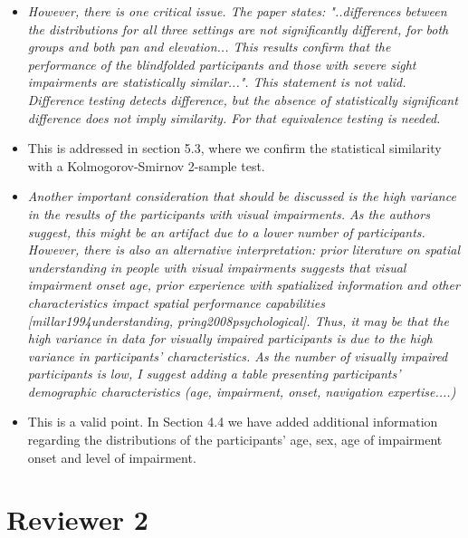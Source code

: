 \documentclass{article}
\begin{document}
\begin{itemize}
  \item \textit{However, there is one critical issue. The paper states: "..differences between the distributions for all three settings are not significantly different, for both groups and both pan and elevation... This results confirm that the performance of the blindfolded participants and those with severe sight impairments are statistically similar...".
    This statement is not valid. Difference testing detects difference, but the absence of statistically significant difference does not imply similarity. For that equivalence testing is needed.}
  \item[] This is addressed in section 5.3, where we confirm the statistical similarity with a Kolmogorov-Smirnov 2-sample test. 

  \item \textit{Another important consideration that should be discussed is the high variance in the results of the participants with visual impairments. As the authors suggest, this might be an artifact due to a lower number of participants. However, there is also an alternative interpretation: prior literature on spatial understanding in people with visual impairments suggests that visual impairment onset age, prior experience with spatialized information and other characteristics impact spatial performance capabilities [millar1994understanding, pring2008psychological]. Thus, it may be that the high variance in data for visually impaired participants is due to the high variance in participants' characteristics. As the number of visually impaired participants is low, I suggest adding a table presenting participants' demographic characteristics (age, impairment, onset, navigation expertise....)}
  \item[] This is a valid point. In Section 4.4 we have added additional information regarding the distributions of the participants' age, sex, age of impairment onset and level of impairment.
\end{itemize}

\section*{Reviewer 2}
\end{document}
